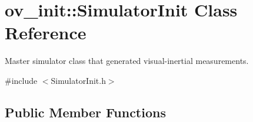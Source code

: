 \hypertarget{classov__init_1_1SimulatorInit}{}\section{ov\+\_\+init\+:\+:Simulator\+Init Class Reference}
\label{classov__init_1_1SimulatorInit}


Master simulator class that generated visual-\/inertial measurements.  




{\ttfamily \#include $<$Simulator\+Init.\+h$>$}

\subsection*{Public Member Functions}
